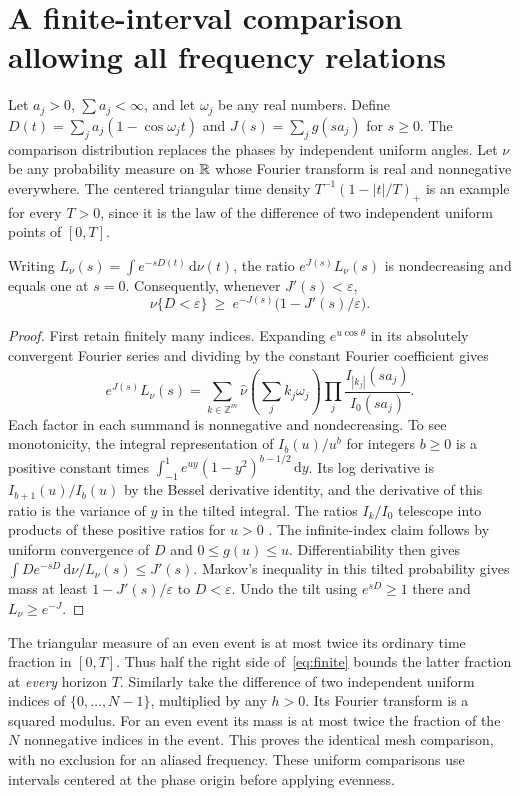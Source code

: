 \documentclass[11pt]{article}
\newcommand{\eps}{\varepsilon}\newcommand{\rd}{\operatorname{rd}}\newcommand{\EE}{\mathbb E}\newcommand{\PP}{\mathbb P}
\newcommand{\dd}{\,\mathrm d}\newcommand{\meas}{\operatorname{meas}}
\begin{document}
\section{A finite-interval comparison allowing all frequency relations}
Let $a_j>0$, $\sum a_j<\infty$, and let $\omega_j$ be any real numbers. Define $D(t)=\sum_j a_j(1-\cos\omega_jt)$ and $J(s)=\sum_j g(sa_j)$ for $s\ge0$. The comparison distribution replaces the phases by independent uniform angles. Let $\nu$ be any probability measure on $\mathbb R$ whose Fourier transform is real and nonnegative everywhere. The centered triangular time density $T^{-1}(1-|t|/T)_+$ is an example for every $T>0$, since it is the law of the difference of two independent uniform points of $[0,T]$.
\begin{lemma}\label{lem:tilt}
Writing $L_\nu(s)=\int e^{-sD(t)}\dd\nu(t)$, the ratio $e^{J(s)}L_\nu(s)$ is nondecreasing and equals one at $s=0$. Consequently, whenever $J'(s)<\eps$,
\begin{equation}\label{eq:finite}
 \nu\{D<\eps\}\ \ge\ e^{-J(s)}\bigl(1-J'(s)/\eps\bigr).
\end{equation}
\end{lemma}
\begin{proof}
First retain finitely many indices. Expanding $e^{u\cos\theta}$ in its absolutely convergent Fourier series and dividing by the constant Fourier coefficient gives
\[
 e^{J(s)}L_\nu(s)=\sum_{k\in\mathbb Z^m}
 \widehat\nu\left(\sum_j k_j\omega_j\right)
 \prod_j\frac{I_{|k_j|}(s a_j)}{I_0(s a_j)}.
\]
Each factor in each summand is nonnegative and nondecreasing. To see monotonicity, the integral representation of $I_b(u)/u^b$ for integers $b\ge0$ is a positive constant times $\int_{-1}^1 e^{uy}(1-y^2)^{b-1/2}\dd y$. Its log derivative is $I_{b+1}(u)/I_b(u)$ by the Bessel derivative identity, and the derivative of this ratio is the variance of $y$ in the tilted integral. The ratios $I_k/I_0$ telescope into products of these positive ratios for $u>0$ \cite{dlmf}. The infinite-index claim follows by uniform convergence of $D$ and $0\le g(u)\le u$. Differentiability then gives
$\int D e^{-sD}\dd\nu/L_\nu(s)\le J'(s)$.
Markov's inequality in this tilted probability gives mass at least $1-J'(s)/\eps$ to $D<\eps$. Undo the tilt using $e^{sD}\ge1$ there and $L_\nu\ge e^{-J}$.
\end{proof}
The triangular measure of an even event is at most twice its ordinary time fraction in $[0,T]$. Thus half the right side of~\eqref{eq:finite} bounds the latter fraction at \emph{every} horizon $T$. Similarly take the difference of two independent uniform indices of $\{0,\ldots,N-1\}$, multiplied by any $h>0$. Its Fourier transform is a squared modulus. For an even event its mass is at most twice the fraction of the $N$ nonnegative indices in the event. This proves the identical mesh comparison, with no exclusion for an aliased frequency. These uniform comparisons use intervals centered at the phase origin before applying evenness.
\end{document}
